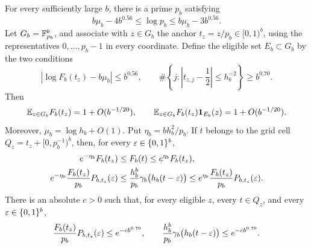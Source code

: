 \begin{lemma}
\label{lem:folded-grid}
For every sufficiently large $b$, there is a prime $p_b$ satisfying
\begin{equation}
 b\mu_b-4b^{0.56}\le\log p_b\le b\mu_b-3b^{0.56}.
 \label{eq:block-prime}
\end{equation}
Let $G_b=\mathbb F_{p_b}^b$, and associate with $z\in G_b$ the anchor
$t_z=z/p_b\in[0,1)^b$, using the representatives
$0,\ldots,p_b-1$ in every coordinate.  Define the eligible set
$E_b\subset G_b$ by the two conditions
\begin{equation}
 \left|\log F_b(t_z)-b\mu_b\right|\le b^{0.56},\qquad
 \#\left\{j:\left|t_{z,j}-\frac12\right|\le h_b^{-2}\right\}
       \ge b^{0.70}.
 \label{eq:block-eligible}
\end{equation}
Then
\begin{equation}
 \mathbb E_{z\in G_b}F_b(t_z)=1+O(b^{-1/20}),\qquad
 \mathbb E_{z\in G_b}F_b(t_z)\mathbf 1_{E_b}(z)=1+O(b^{-1/20}).
 \label{eq:block-mass}
\end{equation}
Moreover, $\mu_b=\log h_b+O(1)$.  Put
$\eta_b=bh_b^2/p_b$.  If $t$ belongs to the grid cell
$Q_z=t_z+[0,p_b^{-1})^b$, then, for every $\varepsilon\in\{0,1\}^b$,
\begin{equation}
 \begin{split}
 e^{-\eta_b}F_b(t_z)&\le F_b(t)\le e^{\eta_b}F_b(t_z),\\
 e^{-\eta_b}\frac{F_b(t_z)}{p_b}P_{b,t_z}(\varepsilon)
 &\le\frac{h_b^b}{p_b}\gamma_b\bigl(h_b(t-\varepsilon)\bigr)
 \le e^{\eta_b}\frac{F_b(t_z)}{p_b}P_{b,t_z}(\varepsilon).
 \end{split}
 \label{eq:block-rounding}
\end{equation}
There is an absolute $c>0$ such that, for every eligible $z$,
every $t\in Q_z$, and every $\varepsilon\in\{0,1\}^b$,
\begin{equation}
 \frac{F_b(t_z)}{p_b}P_{b,t_z}(\varepsilon)\le e^{-c b^{0.70}},
 \qquad
 \frac{h_b^b}{p_b}\gamma_b\bigl(h_b(t-\varepsilon)\bigr)
       \le e^{-c b^{0.70}}.
 \label{eq:block-atom}
\end{equation}
\end{lemma}

